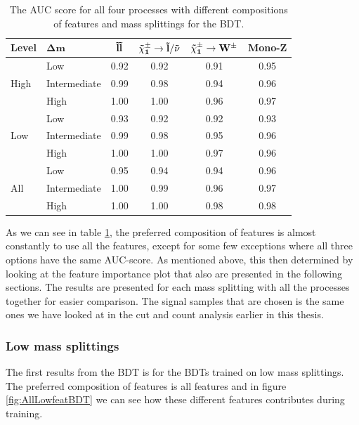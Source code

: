 \begin{table}[H]
    \centering
    \renewcommand{\arraystretch}{1.}
    \begin{tabular}{l l c c c c }
    \toprule
    \textbf{Level} & $\mathbf{\Delta m}$ & $\mathbf{\Tilde{l} \Tilde{l}}$ & $\mathbf{\Tilde{\chi}_1^\pm \rightarrow \Tilde{l}/\Tilde{\nu}}$ & $\mathbf{\Tilde{\chi}_1^\pm \rightarrow W^\pm}$ & \textbf{Mono-Z}  \\
    \midrule
    \midrule
    \multirow{3}{*}{High} &  Low   & 0.92 & 0.92 & 0.91 & 0.95 \\
     & Intermediate & 0.99 & 0.98 & 0.94 & 0.96 \\
     & High & 1.00 & 1.00 & 0.96 & 0.97 \\
     \midrule
    \multirow{3}{*}{Low} & Low & 0.93 & 0.92 & 0.92 & 0.93 \\
     & Intermediate & 0.99 & 0.98 & 0.95 & 0.96 \\
     & High & 1.00 & 1.00 & 0.97 & 0.96 \\
     \midrule
    \multirow{3}{*}{All} & Low & 0.95 & 0.94 & 0.94 & 0.96 \\
     & Intermediate & 1.00 & 0.99 & 0.96 & 0.97 \\
     & High & 1.00 & 1.00 & 0.98 & 0.98 \\
     \bottomrule
    \end{tabular}
    \caption{The AUC score for all four processes with different compositions of features and mass splittings for the BDT.}
    \label{tab:AUCBDT}
\end{table}


As we can see in table \ref{tab:AUCBDT}, the preferred composition of features is almost constantly to use all the features, except for some few exceptions where all three options have the same AUC-score. As mentioned above, this then determined by looking at the feature importance plot that also are presented in the following sections. The results are presented for each mass splitting with all the processes together for easier comparison. The signal samples that are chosen is the same ones we have looked at in the cut and count analysis earlier in this thesis.
















\subsubsection{Low mass splittings}
The first results from the BDT is for the BDTs trained on low mass splittings. The preferred composition of features is all features and in figure \ref{fig:AllLowfeatBDT} we can see how these different features contributes during training. 


